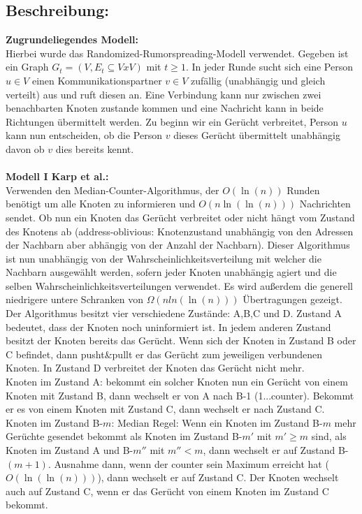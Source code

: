 \documentclass[12pt,a4paper]{report}
\begin{document}
\subsection*{Beschreibung:}
\textbf{Zugrundeliegendes Modell:}\\
 Hierbei wurde das Randomized-Rumorspreading-Modell verwendet. Gegeben ist ein Graph $G_t=(V,E_t \subseteq VxV)$ mit $t \ge 1$. In jeder Runde sucht sich eine Person $u \in V$ einen Kommunikationspartner $v \in V$ zufällig (unabhängig und gleich verteilt) aus und ruft diesen an. Eine Verbindung kann nur zwischen zwei benachbarten Knoten zustande kommen und eine Nachricht kann in beide Richtungen übermittelt werden. Zu beginn wir ein Gerücht verbreitet, Person $u$ kann nun entscheiden, ob die Person $v$ dieses Gerücht übermittelt unabhängig davon ob $v$ dies bereits kennt.\\
\\
\textbf{Modell I Karp et al.:}\\
Verwenden den Median-Counter-Algorithmus, der $O(\ln(n))$ Runden benötigt um alle Knoten zu informieren und $O(n\ln(\ln(n)))$ Nachrichten sendet. Ob nun ein Knoten das Gerücht verbreitet oder nicht hängt vom Zustand des Knotens ab (address-oblivious: Knotenzustand unabhängig von den Adressen der Nachbarn aber abhängig von der Anzahl der Nachbarn). Dieser Algorithmus ist nun unabhängig von der Wahrscheinlichkeitsverteilung mit welcher die Nachbarn ausgewählt werden, sofern jeder Knoten unabhängig agiert und die selben Wahrscheinlichkeitsverteilungen verwendet. Es wird außerdem die generell niedrigere untere Schranken von $\Omega (n ln(\ln(n)))$ Übertragungen gezeigt. Der Algorithmus besitzt vier verschiedene Zustände: A,B,C und D. Zustand A bedeutet, dass der Knoten noch uninformiert ist. In jedem anderen Zustand besitzt der Knoten bereits das Gerücht. Wenn sich der Knoten in Zustand B oder C befindet, dann pusht\&pullt er das Gerücht zum jeweiligen verbundenen Knoten. In Zustand D verbreitet der Knoten das Gerücht nicht mehr. \\
Knoten im Zustand A:
bekommt ein solcher Knoten nun ein Gerücht von einem Knoten mit Zustand B, dann wechselt er von A nach B-1 (1...counter). Bekommt er es von einem Knoten mit Zustand C, dann wechselt er nach Zustand C.\\
Knoten im Zustand B-$m$: Median Regel: Wenn ein Knoten im Zustand B-$m$ mehr Gerüchte gesendet bekommt als Knoten im Zustand B-$m'$ mit $m' \ge m$ sind, als Knoten im Zustand A und B-$m''$ mit $m'' < m$, dann wechselt er auf Zustand B-$(m+1)$. Ausnahme dann, wenn der counter sein Maximum erreicht hat ($O(\ln(\ln(n)))$), dann wechselt er auf Zustand C. Der Knoten wechselt auch auf Zustand C, wenn er das Gerücht von einem Knoten im Zustand C bekommt.\\
\end{document}
